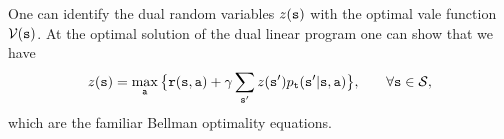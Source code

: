 \begin{leftbar}
One can identify the dual random variables $z({\tt s})$ with the
optimal vale function $\mathcal{V}({\tt s})$. At the optimal solution of
the dual linear program one can show that we have
\begin{align*}
 z({\tt s}) &= \max_{\tt a} \big\{
{\tt r}({\tt s},{\tt a}) + \gamma
\sum_{{\tt s}'}z({\tt s}')p_{{\tt t}}({\tt s}'|{\tt s},{\tt a}) \big\} ,
&\quad\forall {\tt s} \in {\mathcal{S}},
\end{align*}
which are the familiar Bellman optimality equations.

%
%
%
%

\end{leftbar}
